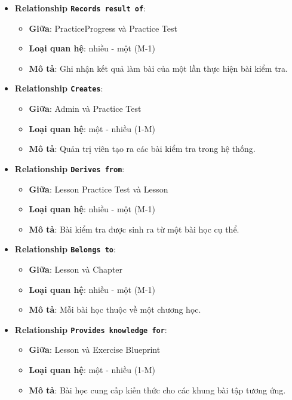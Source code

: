 \begin{itemize}
\item \textbf{Relationship \texttt{Records result of}}:
\begin{itemize}
    \item \textbf{Giữa}: PracticeProgress và Practice Test
    \item \textbf{Loại quan hệ}: nhiều - một (M-1)
    \item \textbf{Mô tả}: Ghi nhận kết quả làm bài của một lần thực hiện bài kiểm tra.
\end{itemize}


\item \textbf{Relationship \texttt{Creates}}:
\begin{itemize}
    \item \textbf{Giữa}: Admin và Practice Test
    \item \textbf{Loại quan hệ}: một - nhiều (1-M)
    \item \textbf{Mô tả}: Quản trị viên tạo ra các bài kiểm tra trong hệ thống.
\end{itemize}


\item \textbf{Relationship \texttt{Derives from}}:
\begin{itemize}
    \item \textbf{Giữa}: Lesson Practice Test và Lesson
    \item \textbf{Loại quan hệ}: nhiều - một (M-1)
    \item \textbf{Mô tả}: Bài kiểm tra được sinh ra từ một bài học cụ thể.
\end{itemize}


\item \textbf{Relationship \texttt{Belongs to}}:
\begin{itemize}
    \item \textbf{Giữa}: Lesson và Chapter
    \item \textbf{Loại quan hệ}: nhiều - một (M-1)
    \item \textbf{Mô tả}: Mỗi bài học thuộc về một chương học.
\end{itemize}


\item \textbf{Relationship \texttt{Provides knowledge for}}:
\begin{itemize}
    \item \textbf{Giữa}: Lesson và Exercise Blueprint
    \item \textbf{Loại quan hệ}: một - nhiều (1-M)
    \item \textbf{Mô tả}: Bài học cung cấp kiến thức cho các khung bài tập tương ứng.
\end{itemize}



\end{itemize}
